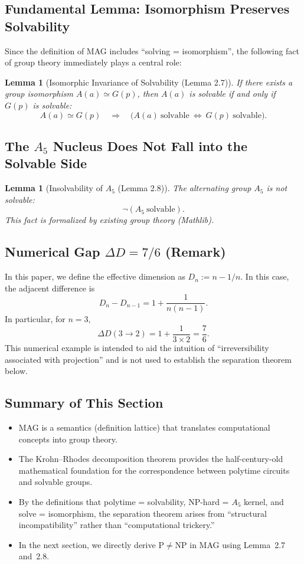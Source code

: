 \documentclass[11pt,a4paper]{article}
\theoremstyle{plain}
\newtheorem{lemma}[theorem]{Lemma}
\theoremstyle{definition}
\newcommand{\Aalt}{A_5}
\begin{document}
\subsection{Fundamental Lemma: Isomorphism Preserves Solvability}

Since the definition of MAG includes ``solving = isomorphism'', the following fact of group theory immediately plays a central role:

\begin{lemma}[Isomorphic Invariance of Solvability (Lemma 2.7)]
If there exists a group isomorphism $A(a) \simeq G(p)$, then $A(a)$ is solvable if and only if $G(p)$ is solvable:
\[
A(a) \simeq G(p) \quad \Longrightarrow \quad \bigl(A(a)\ \text{solvable}\ \Leftrightarrow\ G(p)\ \text{solvable}\bigr).
\]
\end{lemma}

\subsection{The $\Aalt$ Nucleus Does Not Fall into the Solvable Side}

\begin{lemma}[Insolvability of $\Aalt$ (Lemma 2.8)]
The alternating group $\Aalt$ is not solvable:
\[
\neg(\Aalt\ \text{solvable}).
\]
This fact is formalized by existing group theory (Mathlib).
\end{lemma}

\subsection{Numerical Gap $\Delta D = 7/6$ (Remark)}

In this paper, we define the effective dimension as $D_n := n - 1/n$. In this case, the adjacent difference is
\[
D_n - D_{n-1} = 1 + \frac{1}{n(n-1)}.
\]
In particular, for $n=3$,
\[
\Delta D(3 \to 2) = 1 + \frac{1}{3 \times 2} = \frac{7}{6}.
\]
This numerical example is intended to aid the intuition of ``irreversibility associated with projection'' and is not used to establish the separation theorem below.

\subsection{Summary of This Section}

\begin{itemize}[nosep]
\item MAG is a semantics (definition lattice) that translates computational concepts into group theory.
\item The Krohn--Rhodes decomposition theorem provides the half-century-old mathematical foundation for the correspondence between polytime circuits and solvable groups.
\item By the definitions that polytime = solvability, NP-hard = $\Aalt$ kernel, and solve = isomorphism, the separation theorem arises from ``structural incompatibility'' rather than ``computational trickery.''
\item In the next section, we directly derive $\mathrm{P} \neq \mathrm{NP}$ in MAG using Lemma~2.7 and~2.8.
\end{itemize}
\end{document}
